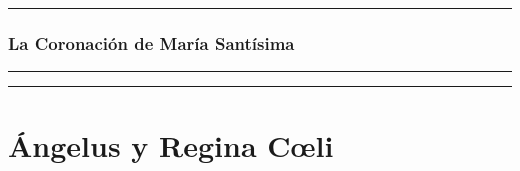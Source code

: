 \documentclass[11pt,a4paper]{report}
\begin{document}
    \rule{\textwidth}{0.5pt}
    

    \subsubsection*{La Coronación de María Santísima}
    
    
    \rule{\textwidth}{0.5pt}

    \rule{\textwidth}{0.5pt}
    

    \section*{Ángelus y Regina Cœli}
    
\end{document}
